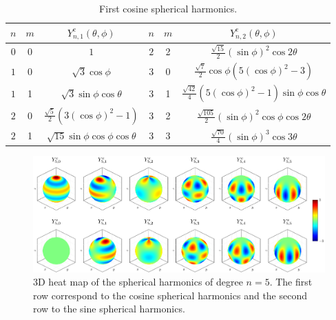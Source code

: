 \documentclass[../main.tex]{subfiles}
\begin{document}
\begin{table}[ht]
  \centering
  \captionsetup{type=table} %
  \begin{tabular}{c|c|c||c|c|c}
    $n$ & $m$ & $Y_{n,1}^{\mathrm{c}}(\theta,\phi)$     & $n$ & $m$ & $Y_{n,2}^{\mathrm{c}}(\theta,\phi)$                        \\
    \hline
    $0$ & 0   & $1$                                     & $2$ & 2   & $\frac{\sqrt{15}}{2}{(\sin\phi)}^2\cos 2\theta$            \\
    $1$ & 0   & $\sqrt{3}\cos\phi$                      & $3$ & 0   & $\frac{\sqrt{7}}{2}\cos\phi(5{(\cos\phi)}^2-3)$            \\
    $1$ & 1   & $\sqrt{3}\sin\phi\cos\theta$            & $3$ & 1   & $\frac{\sqrt{42}}{4}(5{(\cos\phi)}^2-1)\sin\phi\cos\theta$ \\
    $2$ & 0   & $\frac{\sqrt{5}}{2}(3{(\cos\phi)}^2-1)$ & $3$ & 2   & $\frac{\sqrt{105}}{2}{(\sin\phi)}^2\cos\phi\cos 2\theta$   \\
    $2$ & 1   & $\sqrt{15}\sin\phi\cos\phi\cos\theta$   & $3$ & 3   & $\frac{\sqrt{70}}{4}{(\sin\phi)}^3\cos 3\theta$            \\
  \end{tabular}
  \caption{First cosine spherical harmonics.}
\end{table}
\begin{figure}[ht]
  \centering
  \includegraphics[width=\textwidth]{Images/sphericalHarmonics.pdf}
  \caption{3D heat map of the spherical harmonics of degree $n=5$. The first row correspond to the cosine spherical harmonics and the second row to the sine spherical harmonics.}
\end{figure}
\end{document}
